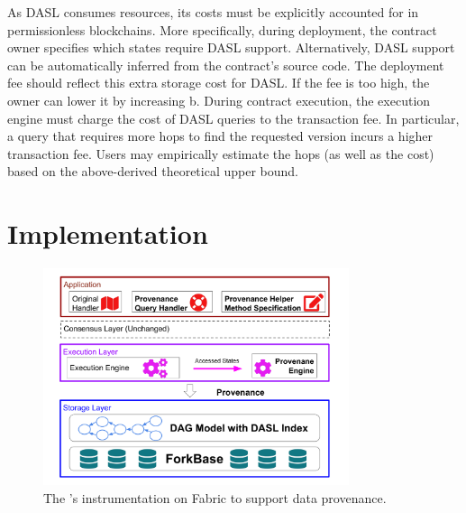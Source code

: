 As DASL consumes resources, its costs must be explicitly accounted for in permissionless blockchains.
More specifically, during deployment, the contract owner specifies which states require DASL support.
Alternatively, DASL support can be automatically inferred from the contract's source code. The deployment fee
should reflect this extra storage cost for DASL. If the fee is too high, the owner can lower it by increasing
b. During contract execution, the execution engine must charge the cost of DASL queries to the transaction
fee. In particular, a query that requires more hops to find the requested version incurs a higher transaction
fee. Users may empirically estimate the hops (as well as the cost) based on the above-derived theoretical upper bound. 

\section{Implementation}
\label{prov:sec:implementation}
\begin{figure}
  \centering
  \includegraphics[width=0.8\textwidth]{diagram/provenance/lineagechain.pdf}
  \caption{The {\fs}'s instrumentation on Fabric to support data provenance. }
  \label{diagram:prov:arch} 
\end{figure}

